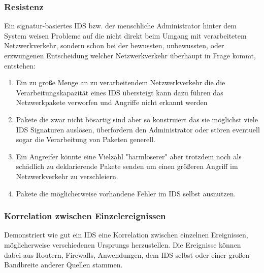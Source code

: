 \subsubsection{Resistenz}
Ein signatur-basiertes IDS bzw. der menschliche Administrator hinter dem System weisen Probleme auf die nicht direkt beim Umgang mit verarbeitetem Netzwerkverkehr, sondern schon bei der bewussten, unbewussten, oder erzwungenen Entscheidung welcher Netzwerkverkehr überhaupt in Frage kommt, entstehen:
\begin{enumerate}
\item{Ein zu große Menge an zu verarbeitendem Netzwerkverkehr die die Verarbeitungskapazität eines IDS übersteigt kann dazu führen das Netzwerkpakete verworfen und Angriffe nicht erkannt werden}
\item{Pakete die zwar nicht bösartig sind aber so konstruiert das sie möglichst viele IDS Signaturen auslösen, überfordern den Administrator oder stören eventuell sogar die Verarbeitung von Paketen generell. }
\item{Ein Angreifer könnte eine Vielzahl "harmloserer" aber trotzdem noch als schädlich zu deklarierende Pakete senden um einen größeren Angriff im Netzwerkverkehr zu verschleiern.}
\item{Pakete die möglicherweise vorhandene Fehler im IDS selbst ausnutzen.}
\end{enumerate}
\subsubsection{Korrelation zwischen Einzelereignissen }
Demonstriert wie gut ein IDS eine Korrelation zwischen einzelnen Ereignissen, möglicherweise verschiedenen Ursprungs herzustellen. Die Ereignisse können dabei aus Routern, Firewalls, Anwendungen, dem IDS selbst oder einer großen Bandbreite anderer Quellen stammen.
